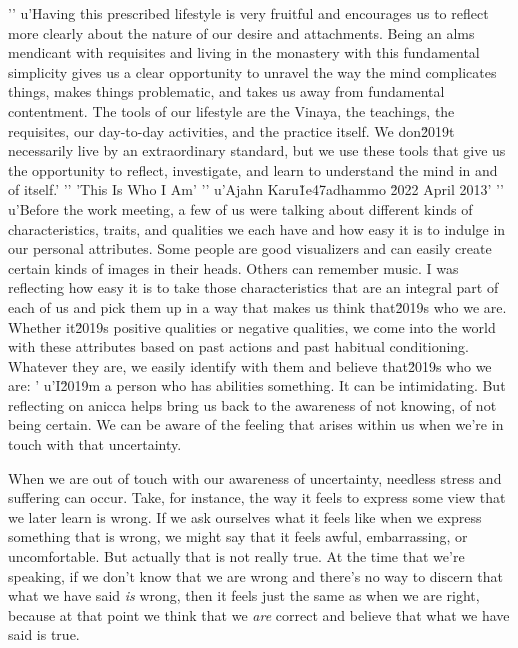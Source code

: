 '\n'
u'Having this prescribed lifestyle is very fruitful and encourages us to reflect more clearly about the nature of our desire and attachments. Being an alms mendicant with requisites and living in the monastery with this fundamental simplicity gives us a clear opportunity to unravel the way the mind complicates things, makes things problematic, and takes us away from fundamental contentment. The tools of our lifestyle are the Vinaya, the teachings, the requisites, our day-to-day activities, and the practice itself. We don\u2019t necessarily live by an extraordinary standard, but we use these tools that give us the opportunity to reflect, investigate, and learn to understand the mind in and of itself.'
'\n'
'This Is Who I Am'
'\n'
u'Ajahn Karu\u1e47adhammo \u2022 April 2013'
'\n'
u'Before the work meeting, a few of us were talking about different kinds of characteristics, traits, and qualities we each have and how easy it is to indulge in our personal attributes. Some people are good visualizers and can easily create certain kinds of images in their heads. Others can remember music. I was reflecting how easy it is to take those characteristics that are an integral part of each of us and pick them up in a way that makes us think that\u2019s who we are. Whether it\u2019s positive qualities or negative qualities, we come into the world with these attributes based on past actions and past habitual conditioning. Whatever they are, we easily identify with them and believe that\u2019s who we are: '
u'I\u2019m a person who has abilities something. It can be 
intimidating. But reflecting on anicca helps bring us back to the 
awareness of not knowing, of not being certain. We can be aware of the 
feeling that arises within us when we're in touch with that uncertainty.

When we are out of touch with our awareness of uncertainty, needless 
stress and suffering can occur. Take, for instance, the way it feels to 
express some view that we later learn is wrong. If we ask ourselves 
what it feels like when we express something that is wrong, we might 
say that it feels awful, embarrassing, or uncomfortable. But actually 
that is not really true. At the time that we're speaking, if we don't 
know that we are wrong and there's no way to discern that what we have 
said \emph{is} wrong, then it feels just the same as when we are right, 
because at that point we think that we \emph{are} correct and believe 
that what we have said is true.

